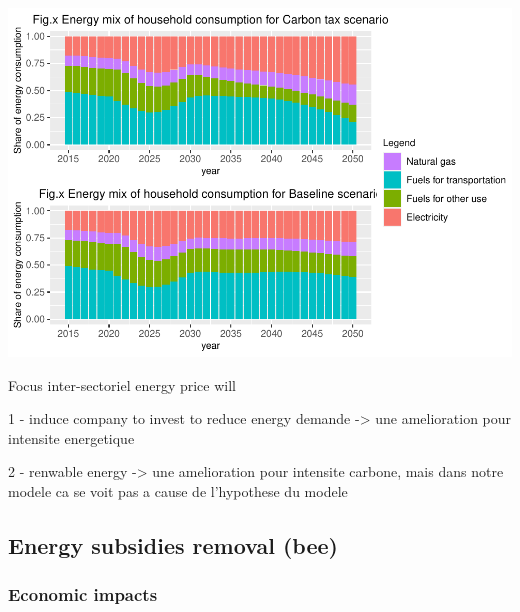 \documentclass[
]{article}
\begin{document}
\includegraphics{Modele-ThreeMe-Tunisie_Sequeira_Valilou_Wang_files/figure-latex/unnamed-chunk-24-1.pdf}

Focus inter-sectoriel energy price will

1 - induce company to invest to reduce energy demande -\textgreater{}
une amelioration pour intensite energetique

2 - renwable energy -\textgreater{} une amelioration pour intensite
carbone, mais dans notre modele ca se voit pas a cause de l'hypothese du
modele

\hypertarget{energy-subsidies-removal-bee}{%
\subsection{Energy subsidies removal
(bee)}\label{energy-subsidies-removal-bee}}

\hypertarget{economic-impacts}{%
\subsubsection{Economic impacts}\label{economic-impacts}}
\end{document}
